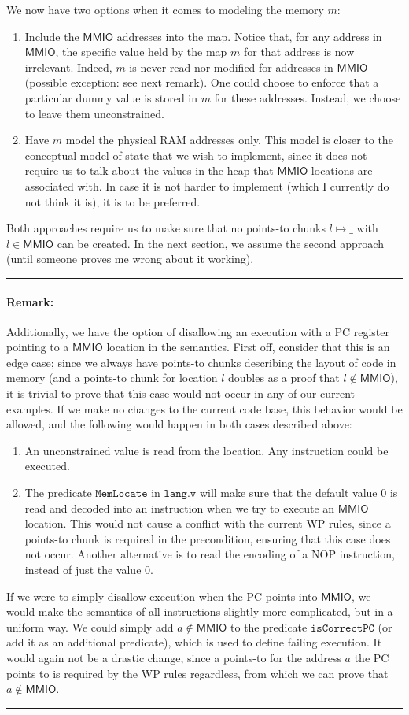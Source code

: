 \documentclass{article}
\newcommand{\X}[1]{\ensuremath{\mathrm{#1}}}
\newcommand{\I}[1]{\ensuremath{\mathtt{#1}}}
\newcommand{\Sf}[1]{\ensuremath{\mathsf{#1}}}
\newcommand{\MMIO}{\Sf{MMIO}\xspace}
\newenvironment{remark}
{ \bigskip\hrule\vspace{-1.3em}\nobreak
  \paragraph*{Remark:}}
{\vspace*{0.5em}\hrule\medskip}
\begin{document}
We now have two options when it comes to modeling the memory $m$:
\begin{enumerate}
\item Include the \MMIO addresses into the map. Notice that, for any address in \MMIO, the specific value held by the map $m$ for
that address is now irrelevant. Indeed, $m$ is never read nor modified for
addresses in \MMIO (possible exception: see next remark). One could choose to enforce that a particular dummy value is stored in $m$ for these addresses. Instead, we choose to leave them
unconstrained.
\item Have $m$ model the physical RAM addresses only. This model is closer to
  the conceptual model of state that we wish to implement, since it does not
  require us to talk about the values in the heap that \MMIO locations are
  associated with. In case it is not harder to implement (which I currently do not think
  it is), it is to be preferred.
\end{enumerate}
Both approaches require us to make sure that no points-to chunks $l \mapsto \_$
with $l \in \MMIO$ can be created. In the next section, we assume the second
approach (until someone proves me wrong about it working).

\begin{remark}
  Additionally, we have the option of disallowing an execution
  with a \X{PC} register pointing to a $\MMIO$ location in the semantics.
  First off, consider that this is an edge case; since we always have points-to
  chunks describing the layout of code in memory (and a points-to chunk for
  location $l$ doubles as a proof that $l \not\in \MMIO$), it is trivial to prove that
  this case would not occur in any of our current examples.
  If we make no changes to the current code base, this behavior would be
  allowed, and the following would happen in both cases described above:
  \begin{enumerate}
  \item An unconstrained value is read from the location. Any instruction could
    be executed.
  \item The predicate $\I{MemLocate}$ in $\I{lang.v}$ will make sure
  that the default value $0$ is read and decoded into an instruction when we try
  to execute an \MMIO location.
  This would not cause a conflict with the current WP rules,
  since a points-to chunk is required in the precondition, ensuring that this
  case does not occur.
  Another alternative is to read the encoding of a $\X{NOP}$ instruction, instead of
  just the value $0$.
\end{enumerate}
  If we were to simply disallow execution when the PC points into \MMIO, we would make the semantics of all instructions slightly more complicated, but in a
  uniform way.
  We could simply add $a \not\in \MMIO$ to the predicate $\I{isCorrectPC}$ (or
  add it as an additional predicate), which is used to define failing execution.
  It would again not be a drastic change, since a points-to for the
  address $a$ the PC points to is required by the WP rules regardless, from which we
  can prove that $a \not\in \MMIO$.
\end{remark}
\end{document}
